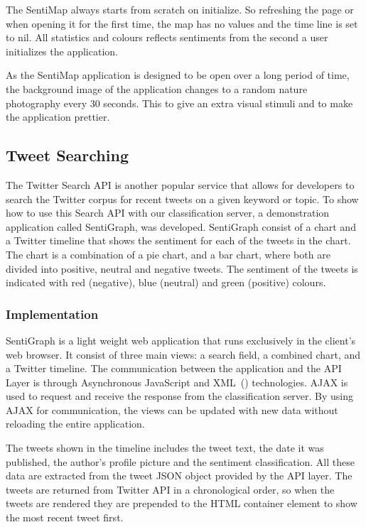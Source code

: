 The SentiMap always starts from scratch on initialize. So refreshing the page or when opening it for the first time, the map has no values and the time line is set to nil. All statistics and colours reflects sentiments from the second a user initializes the application.

As the SentiMap application is designed to be open over a long period of time, the background image of the application changes to a random nature photography every 30 seconds. This to give an extra visual stimuli and to make the application prettier.



\subsection{Tweet Searching}

The Twitter Search API is another popular service that allows for developers to search the Twitter corpus for recent tweets on a given keyword or topic. To show how to use this Search API with our classification server, a demonstration application called SentiGraph, was developed. SentiGraph consist of a chart and a Twitter timeline that shows the sentiment for each of the tweets in the chart. The chart is a combination of a pie chart, and a bar chart, where both are divided into positive, neutral and negative tweets. The sentiment of the tweets is indicated with red (negative), blue (neutral) and green (positive) colours.

\subsubsection{Implementation}

SentiGraph is a light weight web application that runs exclusively in the client's web browser. It consist of three main views: a search field, a combined chart, and a Twitter timeline. The communication between the application and the API Layer is through Asynchronous JavaScript and XML~() technologies. AJAX is used to request and receive the response from the classification server. By using AJAX for communication, the views can be updated with new data without reloading the entire application.

The tweets shown in the timeline includes the tweet text, the date it was published, the author's profile picture and the sentiment classification. All these data are extracted from the tweet JSON object provided by the API layer. The tweets are returned from Twitter API in a chronological order, so when the tweets are rendered they are prepended to the HTML container element to show the most recent tweet first.

